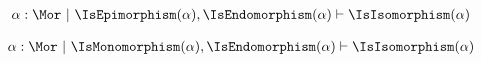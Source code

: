 \begin{sequent}
\begin{align*}
  \alpha:\Mor ~|~ \IsEpimorphism( \alpha ), \IsEndomorphism( \alpha ) \vdash \IsIsomorphism( \alpha )
\end{align*}
\end{sequent}

\begin{sequent}
\begin{align*}
  \alpha:\Mor ~|~ \IsMonomorphism( \alpha ), \IsEndomorphism( \alpha ) \vdash \IsIsomorphism( \alpha )
\end{align*}
\end{sequent}
